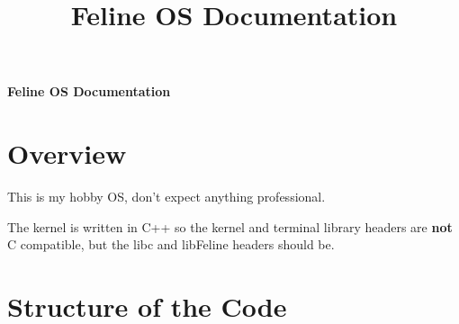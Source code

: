 \documentclass[12pt]{article}
\title{Feline OS Documentation}
\begin{document}
\begin{center}
\fontsize{25}{35}
\selectfont
\textbf{Feline OS Documentation}
\end{center}

\section{Overview}
\begin{list}{}{}
\item This is my hobby OS, don't expect anything professional.
\item The kernel is written in C++ so the kernel and terminal library headers are \textbf{not} C compatible, but the libc and libFeline headers should be.
\end{list}

\section{Structure of the Code}
\end{document}
